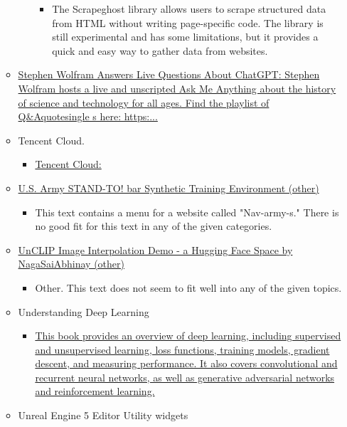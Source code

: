 \begin{itemize}
\begin{itemize}
\begin{itemize}
\begin{itemize}
      \item
        The Scrapeghost library allows users to scrape structured data
        from HTML without writing page-specific code. The library is
        still experimental and has some limitations, but it provides a
        quick and easy way to gather data from websites.
      \end{itemize}
    \end{itemize}
  \item
    \href{https://youtu.be/zLnhg9kir3Q}{Stephen Wolfram Answers Live
    Questions About ChatGPT: Stephen Wolfram hosts a live and unscripted
    Ask Me Anything about the history of science and technology for all
    ages. Find the playlist of Q\&Aquotesingle s here: https:...}
  \item
    Tencent Cloud.

    \begin{itemize}
     
    \item
      \href{https://www.tencentcloud.com/dynamic/news-details/100437?lang=en\&pg=}{Tencent
      Cloud:}
    \end{itemize}
  \item
    \href{https://www.army.mil/standto/archive/2018/03/26/}{U.S. Army
    STAND-TO! bar{} Synthetic Training Environment (other)}

    \begin{itemize}
     
    \item
      This text contains a menu for a website called "Nav-army-s." There
      is no good fit for this text in any of the given categories.
    \end{itemize}
  \item
    \href{https://huggingface.co/spaces/nagasaiabhinay/unclip_image_interpolation_demo}{UnCLIP
    Image Interpolation Demo - a Hugging Face Space by NagaSaiAbhinay
    (other)}

    \begin{itemize}
     
    \item
      Other. This text does not seem to fit well into any of the given
      topics.
    \end{itemize}
  \item
    Understanding Deep Learning

    \begin{itemize}
     
    \item
      \href{https://udlbook.github.io/udlbook/}{This book provides an
      overview of deep learning, including supervised and unsupervised
      learning, loss functions, training models, gradient descent, and
      measuring performance. It also covers convolutional and recurrent
      neural networks, as well as generative adversarial networks and
      reinforcement learning.}
    \end{itemize}
  \item
    Unreal Engine 5 Editor Utility widgets


\end{itemize}
\end{itemize}
